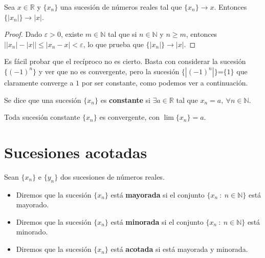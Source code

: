 \begin{prop}
    Sea $x \in \mathbb{R}$ y $\{x_n\}$ una sucesión de números reales tal que $\{x_n\}\longrightarrow x$.
    Entonces $\{ \left| x_n \right| \} \longrightarrow \left| x \right|$.
\end{prop}
\begin{proof}
    Dado $\varepsilon > 0$, existe $m \in \mathbb{N}$ tal que si $n \in \mathbb{N}$ y $n \geq m$, entonces
    $\left| |x_n|-|x| \right| \leq \left| x_n-x \right| < \varepsilon$, lo que prueba que
    $\{ \left| x_n \right| \} \longrightarrow \left| x \right|$.
\end{proof}

Es fácil probar que el recíproco no es cierto. Basta con considerar la sucesión $\{(-1)^n\}$ y ver que no es convergente, pero la sucesión $\{|(-1)^n|\}$=$\{1\}$ que claramente converge a $1$ por ser constante, como podemos ver a continuación.

\begin{definicion}
    Se dice que una sucesión $\{x_n\}$  es \textbf{constante} si $\exists a \in \mathbb{R}$ tal que $x_n=a,~\forall n \in \mathbb{N}$.
\end{definicion}
\begin{lema}
    Toda sucesión constante $\{x_n\}$ es convergente, con $\lim \{x_n\} = a$.
\end{lema}



\section{Sucesiones acotadas}
\begin{definicion}
    Sean $\{x_n\}$ e $\{y_n\}$ dos sucesiones de números reales.
    \begin{itemize}
        \item Diremos que la sucesión $\{x_n\}$ está \textbf{mayorada} si el conjunto $\{x_n~:~n \in \mathbb{N}\}$ está mayorado.

        \item Diremos que la sucesión $\{x_n\}$ está \textbf{minorada} si el conjunto $\{x_n~:~n \in \mathbb{N}\}$ está minorado.

        \item Diremos que la sucesión $\{x_n\}$ está \textbf{acotada} si está mayorada y minorada.
    \end{itemize}
\end{definicion}

